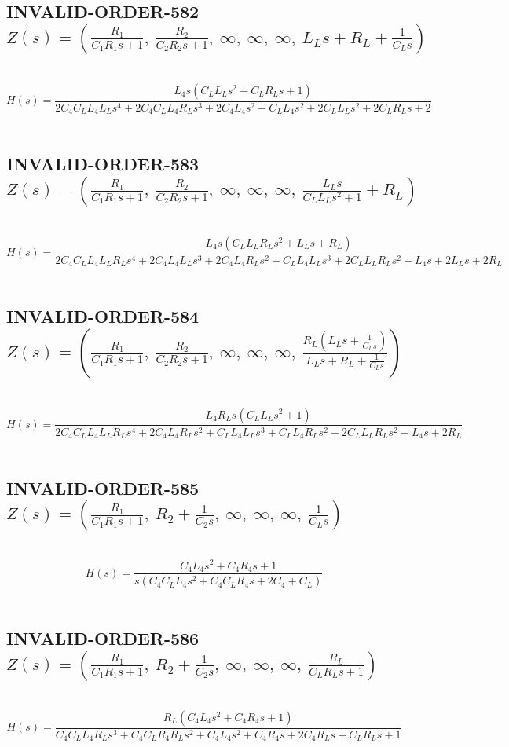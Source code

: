 \documentclass{article}
\begin{document}
\subsection{INVALID-ORDER-582 $Z(s) = \left( \frac{R_{1}}{C_{1} R_{1} s + 1}, \  \frac{R_{2}}{C_{2} R_{2} s + 1}, \  \infty, \  \infty, \  \infty, \  L_{L} s + R_{L} + \frac{1}{C_{L} s}\right)$ } \ 
\textbf{\[H(s) = \frac{L_{4} s \left(C_{L} L_{L} s^{2} + C_{L} R_{L} s + 1\right)}{2 C_{4} C_{L} L_{4} L_{L} s^{4} + 2 C_{4} C_{L} L_{4} R_{L} s^{3} + 2 C_{4} L_{4} s^{2} + C_{L} L_{4} s^{2} + 2 C_{L} L_{L} s^{2} + 2 C_{L} R_{L} s + 2}\] } \ 
\subsection{INVALID-ORDER-583 $Z(s) = \left( \frac{R_{1}}{C_{1} R_{1} s + 1}, \  \frac{R_{2}}{C_{2} R_{2} s + 1}, \  \infty, \  \infty, \  \infty, \  \frac{L_{L} s}{C_{L} L_{L} s^{2} + 1} + R_{L}\right)$ } \ 
\textbf{\[H(s) = \frac{L_{4} s \left(C_{L} L_{L} R_{L} s^{2} + L_{L} s + R_{L}\right)}{2 C_{4} C_{L} L_{4} L_{L} R_{L} s^{4} + 2 C_{4} L_{4} L_{L} s^{3} + 2 C_{4} L_{4} R_{L} s^{2} + C_{L} L_{4} L_{L} s^{3} + 2 C_{L} L_{L} R_{L} s^{2} + L_{4} s + 2 L_{L} s + 2 R_{L}}\] } \ 
\subsection{INVALID-ORDER-584 $Z(s) = \left( \frac{R_{1}}{C_{1} R_{1} s + 1}, \  \frac{R_{2}}{C_{2} R_{2} s + 1}, \  \infty, \  \infty, \  \infty, \  \frac{R_{L} \left(L_{L} s + \frac{1}{C_{L} s}\right)}{L_{L} s + R_{L} + \frac{1}{C_{L} s}}\right)$ } \ 
\textbf{\[H(s) = \frac{L_{4} R_{L} s \left(C_{L} L_{L} s^{2} + 1\right)}{2 C_{4} C_{L} L_{4} L_{L} R_{L} s^{4} + 2 C_{4} L_{4} R_{L} s^{2} + C_{L} L_{4} L_{L} s^{3} + C_{L} L_{4} R_{L} s^{2} + 2 C_{L} L_{L} R_{L} s^{2} + L_{4} s + 2 R_{L}}\] } \ 
\subsection{INVALID-ORDER-585 $Z(s) = \left( \frac{R_{1}}{C_{1} R_{1} s + 1}, \  R_{2} + \frac{1}{C_{2} s}, \  \infty, \  \infty, \  \infty, \  \frac{1}{C_{L} s}\right)$ } \ 
\textbf{\[H(s) = \frac{C_{4} L_{4} s^{2} + C_{4} R_{4} s + 1}{s \left(C_{4} C_{L} L_{4} s^{2} + C_{4} C_{L} R_{4} s + 2 C_{4} + C_{L}\right)}\] } \ 
\subsection{INVALID-ORDER-586 $Z(s) = \left( \frac{R_{1}}{C_{1} R_{1} s + 1}, \  R_{2} + \frac{1}{C_{2} s}, \  \infty, \  \infty, \  \infty, \  \frac{R_{L}}{C_{L} R_{L} s + 1}\right)$ } \ 
\textbf{\[H(s) = \frac{R_{L} \left(C_{4} L_{4} s^{2} + C_{4} R_{4} s + 1\right)}{C_{4} C_{L} L_{4} R_{L} s^{3} + C_{4} C_{L} R_{4} R_{L} s^{2} + C_{4} L_{4} s^{2} + C_{4} R_{4} s + 2 C_{4} R_{L} s + C_{L} R_{L} s + 1}\] } \ 
\end{document}
